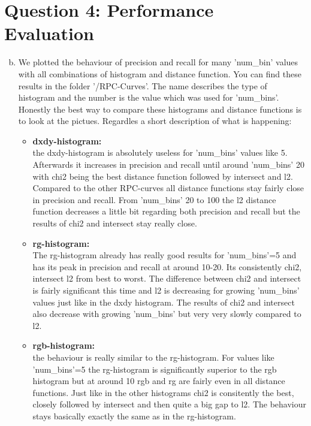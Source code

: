 \documentclass[12pt]{article}
\begin{document}
\newpage
\section*{Question 4: Performance Evaluation}

\begin{enumerate}[a)]
    \setcounter{enumi}{1}
    \item 
        We plotted the behaviour of precision and recall for many 'num\_bin' values with all combinations of histogram and distance function. You can find these results in the folder '/RPC-Curves'. The name describes the type of histogram and the number is the value which was used for 'num\_bins'. Honestly the best way to compare these histograms and distance functions is to look at the pictues. Regardles a short description of what is happening:
        \begin{itemize}
            \item 
                \textbf{dxdy-histogram:}\\
                the dxdy-histogram is absolutely useless for 'num\_bins' values like 5. Afterwards it increases in precision and recall until around 'num\_bins' 20 with chi2 being the best distance function followed by intersect and l2. Compared to the other RPC-curves all distance functions stay fairly close in precision and recall. From 'num\_bins' 20 to 100 the l2 distance function decreases a little bit regarding both precision and recall but the results of chi2 and intersect stay really close.
            \item 
                \textbf{rg-histogram:}\\
                The rg-histogram already has really good results for 'num\_bins'=5 and has its peak in precision and recall at around 10-20. Its consistently chi2, intersect l2 from best to worst. The difference between chi2 and intersect is fairly significant this time and l2 is decreasing for growing 'num\_bins' values just like in the dxdy histogram. The results of chi2 and intersect also decrease with growing 'num\_bins' but very very slowly compared to l2.
            \item 
                \textbf{rgb-histogram:}\\
                the behaviour is really similar to the rg-histogram. For values like 'num\_bins'=5 the rg-histogram is significantly superior to the rgb histogram but at around 10 rgb and rg are fairly even in all distance functions. Just like in the other histograms chi2 is consitently the best, closely followed by intersect and then quite a big gap to l2. The behaviour stays basically exactly the same as in the rg-histogram.

\end{itemize}
\end{enumerate}
\end{document}

